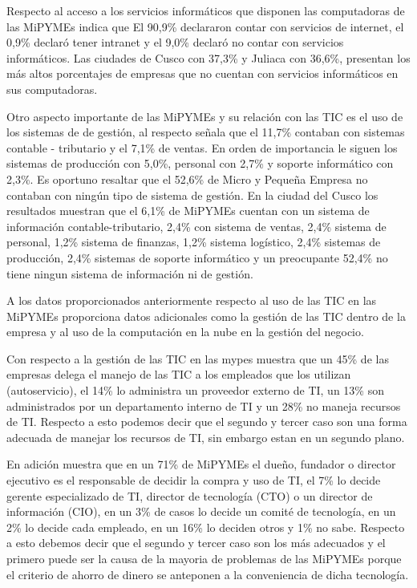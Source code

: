 Respecto al acceso a los servicios informáticos que disponen las computadoras de
las MiPYMEs \cite{inei1} indica que El 90,9\% declararon contar con servicios de
internet, el 0,9\% declaró tener intranet y el 9,0\% declaró no contar con
servicios informáticos. Las ciudades de Cusco con 37,3\% y Juliaca con 36,6\%,
presentan los más altos porcentajes de empresas que no cuentan con servicios
informáticos en sus computadoras.

Otro aspecto importante de las MiPYMEs y su relación con las TIC es el uso de los
sistemas de de gestión, al respecto \citep{inei1} señala que el 11,7\% contaban
con sistemas contable - tributario y el 7,1\% de ventas. En orden de importancia
le siguen los sistemas de producción con 5,0\%, personal con 2,7\% y soporte informático
con 2,3\%. Es oportuno resaltar que el 52,6\% de Micro y Pequeña Empresa no contaban
con ningún tipo de sistema de gestión. En la ciudad del Cusco los resultados
muestran que el 6,1\% de MiPYMEs cuentan con un sistema de información contable-tributario,
2,4\% con sistema de ventas, 2,4\% sistema de personal, 1,2\% sistema de finanzas,
1,2\% sistema logístico, 2,4\% sistemas de producción, 2,4\% sistemas de soporte
informático y un preocupante 52,4\% no tiene ningun sistema de información ni de
gestión.

A los datos proporcionados anteriormente respecto al uso de las TIC en las MiPYMEs
\cite{ipsos} proporciona datos adicionales como la gestión de las TIC dentro
de la empresa y al uso de la computación en la nube en la gestión del negocio.

Con respecto a la gestión de las TIC en las mypes \citep{ipsos} muestra que un
45\% de las empresas delega el manejo de las TIC a los empleados que los utilizan
(autoservicio), el 14\% lo administra un proveedor externo de TI, un 13\% son administrados
por un departamento interno de TI y un 28\% no maneja recursos de TI. Respecto a
esto podemos decir que el segundo y tercer caso son una forma adecuada de manejar
los recursos de TI, sin embargo estan en un segundo plano.

En adición \cite{ipsos} muestra que en un 71\% de MiPYMEs el dueño, fundador o director
ejecutivo es el responsable de decidir la compra y uso de TI, el 7\% lo decide
gerente especializado de TI, director de tecnología (CTO) o un director de información
(CIO), en un 3\% de casos lo decide un comité de tecnología, en un 2\% lo decide
cada empleado, en un 16\% lo deciden otros y 1\% no sabe. Respecto a esto debemos
decir que el segundo y tercer caso son los más adecuados y el primero puede ser la
causa de la mayoria de problemas de las MiPYMEs porque el criterio de ahorro de dinero
se anteponen a la conveniencia de dicha tecnología.

